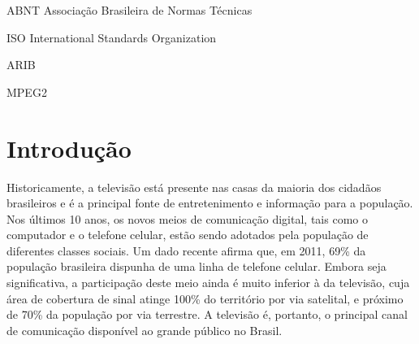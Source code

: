 \documentclass[
	12pt,				%
	openright,			%
	twoside,			%
	a4paper,			%
	english,			%
	french,				%
	brazil				%
	]{abntex2}
\begin{document}
\listoffigures*
\cleardoublepage


\begin{siglas}
  \item[ABNT] Associação Brasileira de Normas Técnicas
  \item[ISO] International Standards Organization
  \item[ARIB]
  \item[MPEG2]
  \item[]
  \item[]
  \item[]
  \item[]
\end{siglas}


\tableofcontents*
\cleardoublepage



\textual

\chapter[Introdução]{Introdução}

Historicamente, a televisão está presente nas casas da maioria dos cidadãos brasileiros e é a principal fonte de
entretenimento e informação para a população. Nos últimos 10 anos, os novos meios de comunicação digital, tais
como o computador e o telefone celular, estão sendo adotados pela população de diferentes classes sociais. Um
dado recente\cite{pnad2011} afirma que, em 2011, 69\% da população brasileira dispunha de uma linha de 
telefone celular. Embora seja significativa, a participação deste meio ainda é muito inferior à da televisão,
cuja área de cobertura de sinal atinge 100\% do território por via satelital, e próximo de
70\% da população por via terrestre. A televisão é, portanto, o principal canal de comunicação disponível ao 
grande público no Brasil.
\end{document}
